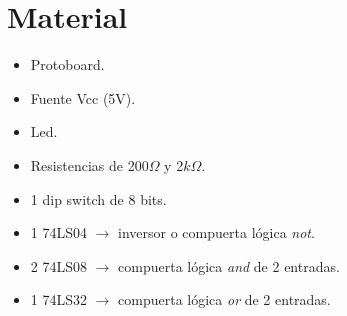 \documentclass[12pt, oneside, openany]{article}
\begin{document}
\section{Material}
{\sffamily\Large
    \begin{itemize}
        \item Protoboard.
        \item Fuente Vcc (5V).
        \item Led.
        \item Resistencias de 200$\Omega$ y 2$k\Omega$.
        \item 1 dip switch de 8 bits.
        \item 1 74LS04 $\to$ inversor o compuerta lógica \emph{not}.
        \item 2 74LS08 $\to$ compuerta lógica \emph{and} de 2 entradas.
        \item 1 74LS32 $\to$ compuerta lógica \emph{or} de 2 entradas.
    \end{itemize}
    
}
\end{document}
